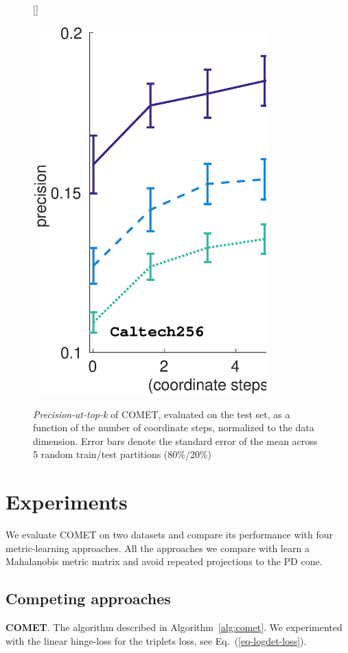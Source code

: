 \documentclass{article} %
\renewcommand{\eqref}[1]{Eq.~(\ref{#1})}
\begin{document}
\begin{figure}[h]
[\FBwidth]
{\caption{\textit{Precision-at-top-k} of COMET, evaluated on the test set, as a function of the number of coordinate steps, normalized to the data dimension. Error bars denote the standard error of the mean across 5 random train/test partitions (80\%/20\%)}\label{cometConvergeFig}}
{\includegraphics[width=9cm]{COMET_convergence_NIPS}}
\end{figure}

\section{Experiments}
We evaluate COMET on two datasets and compare its performance with four metric-learning approaches. All the approaches we compare with learn a Mahalanobis metric matrix and avoid repeated projections to the PD cone. 

\subsection{Competing approaches}

\textbf{COMET}. The algorithm described in Algorithm~\ref{alg:comet}. We experimented with the linear hinge-loss for the triplets loss, see \eqref{eq-logdet-loss}.
\end{document}
